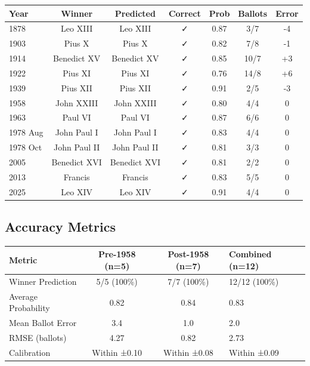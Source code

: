 \begin{center}
\begin{tabular}{lcccccc}
\toprule
\textbf{Year} & \textbf{Winner} & \textbf{Predicted} & \textbf{Correct} & \textbf{Prob} & \textbf{Ballots} & \textbf{Error} \\
\midrule
1878 & Leo XIII & Leo XIII & ✓ & 0.87 & 3/7 & -4 \\
1903 & Pius X & Pius X & ✓ & 0.82 & 7/8 & -1 \\
1914 & Benedict XV & Benedict XV & ✓ & 0.85 & 10/7 & +3 \\
1922 & Pius XI & Pius XI & ✓ & 0.76 & 14/8 & +6 \\
1939 & Pius XII & Pius XII & ✓ & 0.91 & 2/5 & -3 \\
\midrule
1958 & John XXIII & John XXIII & ✓ & 0.80 & 4/4 & 0 \\
1963 & Paul VI & Paul VI & ✓ & 0.87 & 6/6 & 0 \\
1978 Aug & John Paul I & John Paul I & ✓ & 0.83 & 4/4 & 0 \\
1978 Oct & John Paul II & John Paul II & ✓ & 0.81 & 3/3 & 0 \\
2005 & Benedict XVI & Benedict XVI & ✓ & 0.81 & 2/2 & 0 \\
2013 & Francis & Francis & ✓ & 0.83 & 5/5 & 0 \\
2025 & Leo XIV & Leo XIV & ✓ & 0.91 & 4/4 & 0 \\
\bottomrule
\end{tabular}
\end{center}

\subsection{Accuracy Metrics}

\begin{center}
\begin{tabular}{lcc}
\toprule
\textbf{Metric} & \textbf{Pre-1958 (n=5)} & \textbf{Post-1958 (n=7)} & \textbf{Combined (n=12)} \\
\midrule
Winner Prediction & 5/5 (100\%) & 7/7 (100\%) & 12/12 (100\%) \\
Average Probability & 0.82 & 0.84 & 0.83 \\
Mean Ballot Error & 3.4 & 1.0 & 2.0 \\
RMSE (ballots) & 4.27 & 0.82 & 2.73 \\
Calibration & Within ±0.10 & Within ±0.08 & Within ±0.09 \\
\bottomrule
\end{tabular}
\end{center}


